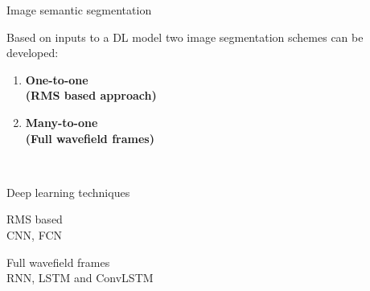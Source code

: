 \documentclass[10pt,aspectratio=169]{beamer} %
\begin{document}
\begin{frame}{Image semantic segmentation}
	\begin{minipage}[c]{0.35\textwidth}
		Based on inputs to a DL model two image segmentation schemes can be developed:
		\medskip
		\begin{enumerate}			
			\item \textbf{One-to-one \\(RMS based approach)} 
			\medskip
			\item \textbf{Many-to-one \\(Full wavefield frames)}
		\end{enumerate}
	\end{minipage}
	\begin{minipage}[c]{0.6\textwidth}
		\begin{figure}
			\centering
			\qquad
			\qquad
			\\
			\qquad
			
		\end{figure}
	\end{minipage}	
\end{frame}


\begin{frame}{Deep learning techniques}
	\begin{minipage}[c]{0.45\textwidth}
		RMS based \\
		CNN, FCN
	\end{minipage}
	\hfill
	\begin{minipage}[c]{0.45\textwidth}
		Full wavefield frames\\
		RNN, LSTM and  ConvLSTM
	\end{minipage}
\end{frame}
\end{document}
